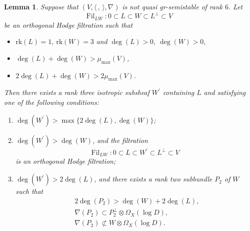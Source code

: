 \documentclass[11pt]{article}
\numberwithin{equation}{section}
\newcommand{\grsemistable}{gr\nobreakdash-semi\-stable\xspace}
\DeclareMathOperator{\Filt}{Fil}
\newcommand{\rk}{\mathrm{rk}}
\theoremstyle{plain}
\newtheorem{lem}[thm]{Lemma}
\theoremstyle{definition}
\begin{document}
\begin{lem}\label{degreeincreasing}
Suppose that $(V,\langle \,, \, \rangle,\nabla)$ is not quasi \grsemistable of rank $6$. Let
\[
\Filt_{LW}:0\subset L\subset W\subset L^\perp\subset V
\]
be an orthogonal Hodge filtration such that
\begin{itemize}
\item $\rk(L)=1, \ \rk(W)=3$ and $\deg(L)>0, \ \deg(W)>0$,
\item $\deg(L)+\deg(W)>\mu_{\max}(V)$,
\item $2\deg(L)+\deg(W)>2\mu_{\max}(V)$.
\end{itemize}
Then there exists a rank three isotropic subsheaf $W^\prime$ containing $L$ and satisfying one of the following conditions:
\begin{enumerate}
\item $\deg(W^\prime)>\max\{2\deg(L),\deg(W)\}$;
\item $\deg(W^\prime)>\deg(W)$, and the filtration
\[
\Filt_{LW}:0\subset L\subset W^\prime\subset L^\perp\subset V
\]
is an orthogonal Hodge filtration;
\item $\deg(W^\prime)>2\deg(L)$, and there exists a rank two subbundle $P_2$ of $W$ such that
\begin{align*}
& 2\deg(P_2)>\deg(W)+2\deg(L), \\
& \nabla(P_2)\subset P_2^\perp\otimes\Omega_X(\log D), \\ & \nabla(P_2)\not\subset W\otimes\Omega_X(\log D).
\end{align*}
\end{enumerate}
\end{lem}
\end{document}
